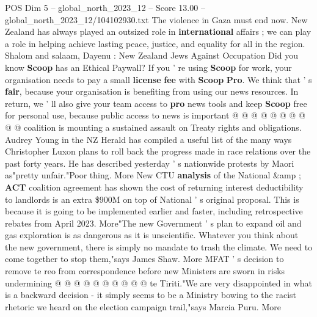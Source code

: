 \begin{textsample}{POS Dim 5 – global\_north\_2023\_12 – Score 13.00 – global\_north\_2023\_12/104102930.txt}
The violence in Gaza must end now.
New Zealand has always played an outsized role in \textbf{international} affairs ; we can play a role in helping achieve lasting peace, justice, and equality for all in the region.
Shalom and salaam, Dayenu : New Zealand Jews Against Occupation Did you know \textbf{Scoop} has an Ethical Paywall?
If you ' re using \textbf{Scoop} for work, your organisation needs to pay a small \textbf{license} \textbf{fee} with \textbf{Scoop} \textbf{Pro}.
We think that ' s \textbf{fair}, because your organisation is benefiting from using our news resources.
In return, we ' ll also give your team access to \textbf{pro} news tools and keep \textbf{Scoop} free for personal use, because public access to news is important @ @ @ @ @ @ @ @ @ @ coalition is mounting a sustained assault on Treaty rights and obligations.
Audrey Young in the NZ Herald has compiled a useful list of the many ways Christopher Luxon plans to roll back the progress made in race relations over the past forty years.
He has described yesterday ' s nationwide protests by Maori as"pretty unfair."Poor thing.
More New CTU \textbf{analysis} of the National \&amp ; \textbf{ACT} coalition agreement has shown the cost of returning interest deductibility to landlords is an extra \$900M on top of National ' s original proposal.
This is because it is going to be implemented earlier and faster, including retrospective rebates from April 2023.
More"The new Government ' s plan to expand oil and gas exploration is as dangerous as it is unscientific.
Whatever you think about the new government, there is simply no mandate to trash the climate.
We need to come together to stop them,"says James Shaw.
More MFAT ' s decision to remove te reo from correspondence before new Ministers are sworn in risks undermining @ @ @ @ @ @ @ @ @ @ te Tiriti."We are very disappointed in what is a backward decision - it simply seems to be a Ministry bowing to the racist rhetoric we heard on the election campaign trail,"says Marcia Puru.
More

\end{textsample}
